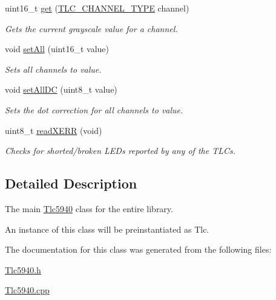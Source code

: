 \begin{DoxyCompactItemize}
uint16\+\_\+t \hyperlink{group__CoreFunctions_gac712fcd944dd3f5f4f0ff158d754ea06}{get} (\hyperlink{tlc__config_8h_ab23dc44a3be02131509f5ab61f68530e}{T\+L\+C\+\_\+\+C\+H\+A\+N\+N\+E\+L\+\_\+\+T\+Y\+PE} channel)
\begin{DoxyCompactList}\small\item\em Gets the current grayscale value for a channel. \end{DoxyCompactList}\item 
void \hyperlink{group__CoreFunctions_gacb63767b2063823e9c5d0e1d8db77ceb}{set\+All} (uint16\+\_\+t value)
\begin{DoxyCompactList}\small\item\em Sets all channels to value. \end{DoxyCompactList}\item 
void \hyperlink{group__CoreFunctions_ga5b39a8719693ebb40aaa1005ab6c7323}{set\+All\+DC} (uint8\+\_\+t value)
\begin{DoxyCompactList}\small\item\em Sets the dot correction for all channels to value. \end{DoxyCompactList}\item 
uint8\+\_\+t \hyperlink{group__CoreFunctions_ga732323bcfa69b08c39485866d692704a}{read\+X\+E\+RR} (void)
\begin{DoxyCompactList}\small\item\em Checks for shorted/broken L\+E\+Ds reported by any of the T\+L\+Cs. \end{DoxyCompactList}\end{DoxyCompactItemize}


\subsection{Detailed Description}
The main \hyperlink{classTlc5940}{Tlc5940} class for the entire library. 

An instance of this class will be preinstantiated as Tlc. 

The documentation for this class was generated from the following files\+:\begin{DoxyCompactItemize}
\item 
\hyperlink{Tlc5940_8h}{Tlc5940.\+h}\item 
\hyperlink{Tlc5940_8cpp}{Tlc5940.\+cpp}\end{DoxyCompactItemize}
